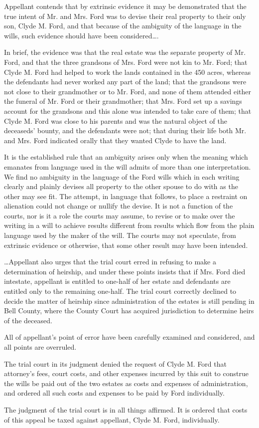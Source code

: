 Appellant contends that by extrinsic evidence it may be demonstrated that the
true intent of Mr. and Mrs. Ford was to devise their real property to their
only son, Clyde M. Ford, and that because of the ambiguity of the language in
the wills, such evidence should have been considered\dots.

In brief, the evidence was that the real estate was the separate property of Mr.
Ford, and that the three grandsons of Mrs. Ford were not kin to Mr. Ford; that
Clyde M. Ford had helped to work the lands contained in the 450 acres, whereas
the defendants had never worked any part of the land; that the grandsons were
not close to their grandmother or to Mr. Ford, and none of them attended either
the funeral of Mr. Ford or their grandmother; that Mrs. Ford set up a savings
account for the grandsons and this alone was intended to take care of them;
that Clyde M. Ford was close to his parents and was the natural object of the
deceaseds' bounty, and the defendants were not; that during their life both Mr.
and Mrs. Ford indicated orally that they wanted Clyde to have the land.

It is the established rule that an ambiguity arises only when the meaning which
emanates from language used in the will admits of more than one interpretation.
We find no ambiguity in the language of the Ford wills which in each writing
clearly and plainly devises all property to the other spouse to do with as the
other may see fit. The attempt, in language that follows, to place a restraint
on alienation could not change or nullify the devise. It is not a function of
the courts, nor is it a role the courts may assume, to revise or to make over
the writing in a will to achieve results different from results which flow from
the plain language used by the maker of the will. The courts may not speculate,
from extrinsic evidence or otherwise, that some other result may have been
intended.

\dots Appellant also urges that the trial court erred in refusing to make a
determination of heirship, and under these points insists that if Mrs. Ford
died intestate, appellant is entitled to one-half of her estate and defendants
are entitled only to the remaining one-half. The trial court correctly declined
to decide the matter of heirship since administration of the estates is still
pending in Bell County, where the County Court has acquired jurisdiction to
determine heirs of the deceased.

All of appellant's point of error have been carefully examined and considered,
and all points are overruled.

The trial court in its judgment denied the request of Clyde M. Ford that
attorney's fees, court costs, and other expenses incurred by this suit to
construe the wills be paid out of the two estates as costs and expenses of
administration, and ordered all such costs and expenses to be paid by Ford
individually.

The judgment of the trial court is in all things affirmed. It is ordered that
costs of this appeal be taxed against appellant, Clyde M. Ford, individually.

